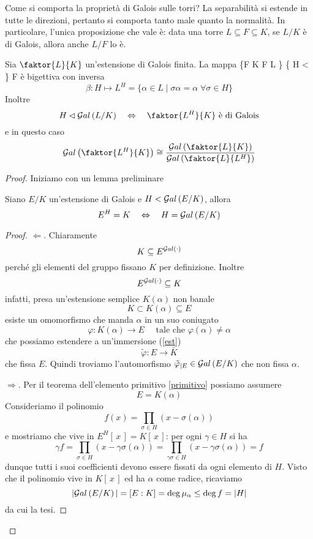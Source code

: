 \begin{multicols}{2}
	Come si comporta la proprietà di Galois sulle torri? La separabilità si estende in tutte le direzioni, pertanto si comporta tanto male quanto la normalità. In particolare, l'unica proposizione che vale è: data una torre $ L \subseteq F \subseteq K $, se $ L/K $ è di Galois, allora anche $ L/F $ lo è.
	
	\begin{theorem}[di corrispondenza]
		Sia $ \faktor{L}{K} $ un'estensione di Galois finita. La mappa
		\fun{\alpha}
		{\{F  \mid K \subseteq F \subseteq L \}}
		{\left\{ H <  \right\}}
		{F}
		{}
		è bigettiva con inversa
		\[ \beta: H \mapsto L^H = \{ \alpha \in L \mid \sigma\alpha = \alpha \;\forall \sigma \in H \} \]
		Inoltre
		\[ H \lhd \Gal{L/K} \LR \faktor{L^H}{K} \text{ è di Galois} \]
		e in questo caso
		\[ \Gal{\faktor{L^H}{K}} \cong \frac{\Gal{\faktor{L}{K}}}{\Gal{\faktor{L}{L^H}}} \]
	\end{theorem}
	\begin{proof}
		Iniziamo con un lemma preliminare
	\begin{prop}
		Siano $ E/K $ un'estensione di Galois e $ H < \mathcal{G}al\left( E/K \right) $, allora
		\[  E^H = K \quad\Leftrightarrow\quad H = \mathcal{G}al\left( E/K \right)  \]
	\end{prop}
	\begin{proof}
		$ \Leftarrow $. Chiaramente 
		\[ K \subseteq E^{\mathcal{G}al\left( \cdot \right)} \]
	perché gli elementi del gruppo fissano $ K $ per definizione.
	Inoltre \[ E^{\mathcal{G}al\left( \cdot \right)} \subseteq K \]
	infatti, presa un'estensione semplice $ K(\alpha) $ non banale
	\[ K \subset K(\alpha) \subseteq E \]
	esiste un omomorfismo che manda $ \alpha $ in un suo coniugato
	\[ \varphi: K(\alpha) \to E \quad\text{ tale che } \varphi(\alpha)\neq \alpha \]
	che possiamo estendere a un'immersione (\ref{est})
	\[ \tilde{\varphi}: E \to \bar{K} \]
	che fissa $ E $.
	Quindi troviamo l'automorfismo $ \tilde{\varphi}_{|E} \in \mathcal{G}al\left( E/K \right) $ che non fissa $ \alpha $.
	
	$ \Rightarrow $. Per il teorema dell'elemento primitivo \ref{primitivo} possiamo assumere
	\[ E = K(\alpha) \]
	Consideriamo il polinomio
	\[ f(x) = \prod_{\sigma \in H}{(x - \sigma(\alpha))} \]
	e mostriamo che vive in $ E^H[\, x\,] = K[\, x\,] $: per ogni $ \gamma \in H $ si ha
	\[ \gamma f = \prod_{\sigma \in H}{(x - \gamma\sigma(\alpha))} = \prod_{\gamma\sigma \in H}{(x - \gamma\sigma(\alpha))} = f \]
	dunque tutti i suoi coefficienti devono essere fissati da ogni elemento di $ H $.
	Visto che il polinomio vive in $ K[\, x\,] $ ed ha $ \alpha $ come radice, ricaviamo
	\[ |\mathcal{G}al\left( E/K \right)| = [E:K] = \deg \mu_\alpha \leq \deg f = |H| \]
	da cui la tesi.
	\end{proof}


\end{proof}
\end{multicols}
